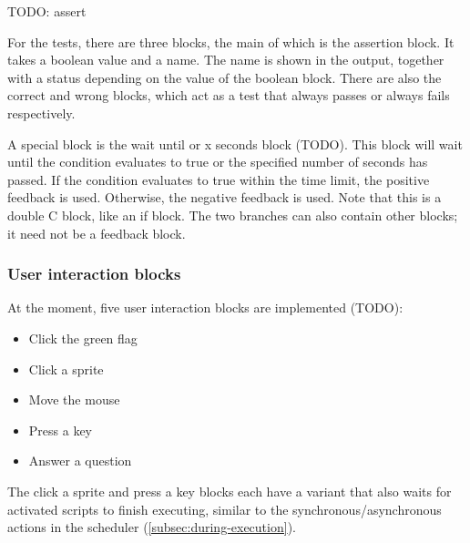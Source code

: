 \documentclass[../main]{subfiles}
\begin{document}
TODO: assert

\begin{minipage}{0.49\linewidth}
    \begin{scratch}[scale=0.7]
    \end{scratch}
\end{minipage}%
\begin{minipage}{0.49\linewidth}
    \begin{scratch}[scale=0.7]
    \end{scratch}
\end{minipage}

For the tests, there are three blocks, the main of which is the assertion block.
It takes a boolean value and a name.
The name is shown in the output, together with a status depending on the value of the boolean block.
There are also the correct and wrong blocks, which act as a test that always passes or always fails respectively.

A special block is the wait until or x seconds block (TODO).
This block will wait until the condition evaluates to true or the specified number of seconds has passed.
If the condition evaluates to true within the time limit, the positive feedback is used.
Otherwise, the negative feedback is used.
Note that this is a double C block, like an if block.
The two branches can also contain other blocks; it need not be a feedback block.

\subsubsection{User interaction blocks}

At the moment, five user interaction blocks are implemented (TODO):

\begin{itemize}
    \item Click the green flag
    \item Click a sprite
    \item Move the mouse
    \item Press a key
    \item Answer a question
\end{itemize}

The click a sprite and press a key blocks each have a variant that also waits for activated scripts to finish executing, similar to the synchronous/asynchronous actions in the scheduler (\cref{subsec:during-execution}).
\end{document}
